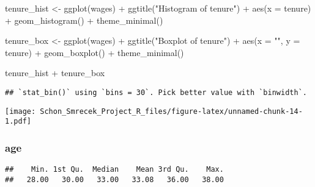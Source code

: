 \documentclass[
]{article}
\newenvironment{Shaded}{\begin{snugshade}}{\end{snugshade}}
\newcommand{\AttributeTok}[1]{\textcolor[rgb]{0.77,0.63,0.00}{#1}}
\newcommand{\FunctionTok}[1]{\textcolor[rgb]{0.00,0.00,0.00}{#1}}
\newcommand{\NormalTok}[1]{#1}
\newcommand{\OtherTok}[1]{\textcolor[rgb]{0.56,0.35,0.01}{#1}}
\newcommand{\SpecialCharTok}[1]{\textcolor[rgb]{0.00,0.00,0.00}{#1}}
\newcommand{\StringTok}[1]{\textcolor[rgb]{0.31,0.60,0.02}{#1}}
\begin{document}
\begin{Shaded}
\begin{Highlighting}[]
\NormalTok{tenure\_hist }\OtherTok{\textless{}{-}} \FunctionTok{ggplot}\NormalTok{(wages) }\SpecialCharTok{+} \FunctionTok{ggtitle}\NormalTok{(}\StringTok{"Histogram of tenure"}\NormalTok{) }\SpecialCharTok{+} \FunctionTok{aes}\NormalTok{(}\AttributeTok{x =}\NormalTok{ tenure) }\SpecialCharTok{+} \FunctionTok{geom\_histogram}\NormalTok{() }\SpecialCharTok{+} \FunctionTok{theme\_minimal}\NormalTok{()}

\NormalTok{tenure\_box }\OtherTok{\textless{}{-}} \FunctionTok{ggplot}\NormalTok{(wages) }\SpecialCharTok{+} \FunctionTok{ggtitle}\NormalTok{(}\StringTok{"Boxplot of tenure"}\NormalTok{) }\SpecialCharTok{+} \FunctionTok{aes}\NormalTok{(}\AttributeTok{x =} \StringTok{""}\NormalTok{, }\AttributeTok{y =}\NormalTok{ tenure) }\SpecialCharTok{+} \FunctionTok{geom\_boxplot}\NormalTok{() }\SpecialCharTok{+} \FunctionTok{theme\_minimal}\NormalTok{()}

\NormalTok{tenure\_hist }\SpecialCharTok{+}\NormalTok{ tenure\_box}
\end{Highlighting}
\end{Shaded}

\begin{verbatim}
## `stat_bin()` using `bins = 30`. Pick better value with `binwidth`.
\end{verbatim}

\texttt{[image: Schon\_Smrecek\_Project\_R\_files/figure-latex/unnamed-chunk-14-1.pdf]}

\hypertarget{age}{%
\subsubsection{age}\label{age}}

\begin{Shaded}
\end{Shaded}

\begin{verbatim}
##    Min. 1st Qu.  Median    Mean 3rd Qu.    Max. 
##   28.00   30.00   33.00   33.08   36.00   38.00
\end{verbatim}
\end{document}
